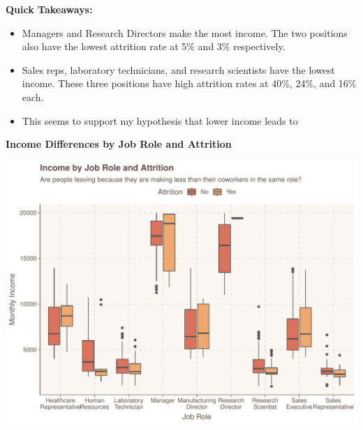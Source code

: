 \documentclass[
]{article}
\newenvironment{Shaded}{\begin{snugshade}}{\end{snugshade}}
\newcommand{\CharTok}[1]{\textcolor[rgb]{0.31,0.60,0.02}{#1}}
\newcommand{\DataTypeTok}[1]{\textcolor[rgb]{0.13,0.29,0.53}{#1}}
\newcommand{\KeywordTok}[1]{\textcolor[rgb]{0.13,0.29,0.53}{\textbf{#1}}}
\newcommand{\NormalTok}[1]{#1}
\newcommand{\OperatorTok}[1]{\textcolor[rgb]{0.81,0.36,0.00}{\textbf{#1}}}
\newcommand{\StringTok}[1]{\textcolor[rgb]{0.31,0.60,0.02}{#1}}
\providecommand{\tightlist}{%
  \setlength{\itemsep}{0pt}\setlength{\parskip}{0pt}}
\begin{document}
\textbf{Quick Takeaways:}

\begin{itemize}
\tightlist
\item
  Managers and Research Directors make the most income. The two
  positions also have the lowest attrition rate at 5\% and 3\%
  respectively.
\item
  Sales reps, laboratory technicians, and research scientists have the
  lowest income. These three positions have high attrition rates at
  40\%, 24\%, and 16\% each.
\item
  This seems to support my hypothesis that lower income leads to
\end{itemize}

\textbf{Income Differences by Job Role and Attrition}

\begin{Shaded}
\end{Shaded}

\includegraphics{figures/Income Differences by Job Role and Attrition-1.pdf}
\end{document}
